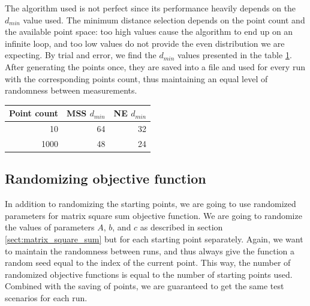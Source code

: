 \documentclass[english, 12pt, a4paper, sci, utf8, a-1b, online, table]{aaltothesis}
\begin{document}
The algorithm used is not perfect since its performance heavily depends on the $d_{min}$ value used. The minimum distance selection depends on the point count and the available point space: too high values cause the algorithm to end up on an infinite loop, and too low values do not provide the even distribution we are expecting. By trial and error, we find the $d_{min}$ values presented in the table \ref{tab:dmin_values}. After generating the points once, they are saved into a file and used for every run with the corresponding points count, thus maintaining an equal level of randomness between measurements.

\begin{table}[H]
\centering
{}
\label{tab:dmin_values}
\begin{tabular}{|r|r|r|}
\hline
\rowcolor{gray!25} 
Point count                       & MSS $d_{min}$ & NE $d_{min}$ \\ \hline
\cellcolor{gray!5}10   & 64           & 32          \\ \hline
\cellcolor{gray!5}1000 & 48           & 24          \\ \hline
\end{tabular}
\end{table}


\subsection{Randomizing objective function}


In addition to randomizing the starting points, we are going to use randomized parameters for matrix square sum objective function. We are going to randomize the values of parameters $A$, $b$, and $c$ as described in section \ref{sect:matrix_square_sum} but for each starting point separately. Again, we want to maintain the randomness between runs, and thus always give the function a random seed equal to the index of the current point. This way, the number of randomized objective functions is equal to the number of starting points used. Combined with the saving of points, we are guaranteed to get the same test scenarios for each run.

\end{document}
